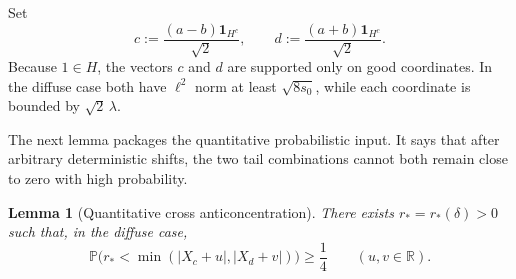 \documentclass[11pt]{amsart}
\numberwithin{equation}{section}
\newtheorem{lemma}[theorem]{Lemma}
\theoremstyle{definition}
\theoremstyle{remark}
\newcommand{\Prob}{\mathbb P}
\newcommand{\R}{\mathbb R}
\newcommand{\abs}[1]{\lvert #1 \rvert}
\begin{document}
Set
\[
c:=\frac{(a-b)\mathbf 1_{H^c}}{\sqrt2},
\qquad
d:=\frac{(a+b)\mathbf 1_{H^c}}{\sqrt2}.
\]
Because $1\in H$, the vectors $c$ and $d$ are supported only on good
coordinates.  In the diffuse case both have $\ell^2$ norm at least
$\sqrt{8s_0}$, while each coordinate is bounded by $\sqrt2\,\lambda$.

The next lemma packages the quantitative probabilistic input.  It says that
after arbitrary deterministic shifts, the two tail combinations cannot both
remain close to zero with high probability.

\begin{lemma}[Quantitative cross anticoncentration]\label{lem:cross}
There exists $r_*=r_*(\delta)>0$ such that, in the diffuse case,
\[
\Prob\bigl(r_*<\min(\abs{X_c+u},\abs{X_d+v})\bigr)\ge \frac14
\qquad(u,v\in\R).
\]
\end{lemma}
\end{document}
